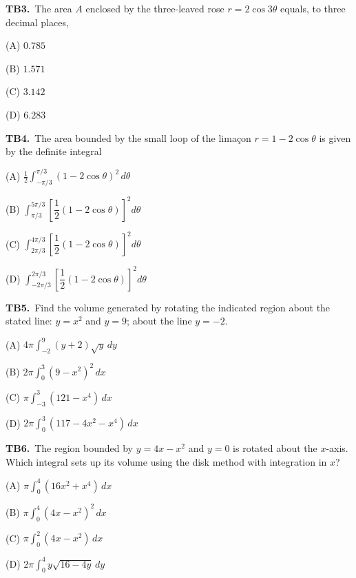 \documentclass[11pt]{article}
\begin{document}
\bigskip\noindent\textbf{TB3.}\ The area $A$ enclosed by the three-leaved rose $r=2\cos 3\theta$ equals, to three decimal places,
\begin{list}{}{\setlength{\leftmargin}{3em}\setlength{\labelwidth}{2.5em}\setlength{\itemsep}{0pt}\setlength{\topsep}{2pt}}
\item[(A)] $0.785$
\item[(B)] $1.571$
\item[(C)] $3.142$
\item[(D)] $6.283$
\end{list}

\bigskip\noindent\textbf{TB4.}\ The area bounded by the small loop of the limaçon $r=1-2\cos\theta$ is given by the definite integral
\begin{list}{}{\setlength{\leftmargin}{3em}\setlength{\labelwidth}{2.5em}\setlength{\itemsep}{0pt}\setlength{\topsep}{2pt}}
\item[(A)] $\displaystyle\frac12\int_{-\pi/3}^{\pi/3}(1-2\cos\theta)^2\,d\theta$
\item[(B)] $\displaystyle\int_{\pi/3}^{5\pi/3} \left[\dfrac{1}{2}(1-2\cos\theta)\right]^2 d\theta$
\item[(C)] $\displaystyle\int_{2\pi/3}^{4\pi/3} \left[\dfrac{1}{2}(1-2\cos\theta)\right]^2 d\theta$
\item[(D)] $\displaystyle\int_{-2\pi/3}^{2\pi/3} \left[\dfrac{1}{2}(1-2\cos\theta)\right]^2 d\theta$
\end{list}

\bigskip\noindent\textbf{TB5.}\ Find the volume generated by rotating the indicated region about the stated line: $y=x^2$ and $y=9$; about the line $y=-2$.
\begin{list}{}{\setlength{\leftmargin}{3em}\setlength{\labelwidth}{2.5em}\setlength{\itemsep}{0pt}\setlength{\topsep}{2pt}}
\item[(A)] $\displaystyle 4\pi\int_{-2}^{9} (y+2)\sqrt{y}\,dy$
\item[(B)] $\displaystyle 2\pi\int_0^3 (9-x^2)^2\,dx$
\item[(C)] $\displaystyle \pi\int_{-3}^{3} (121-x^4)\,dx$
\item[(D)] $\displaystyle 2\pi\int_0^3 (117-4x^2-x^4)\,dx$
\end{list}

\bigskip\noindent\textbf{TB6.}\ The region bounded by $y=4x-x^2$ and $y=0$ is rotated about the $x$-axis. Which integral sets up its volume using the disk method with integration in $x$?
\begin{list}{}{\setlength{\leftmargin}{3em}\setlength{\labelwidth}{2.5em}\setlength{\itemsep}{0pt}\setlength{\topsep}{2pt}}
\item[(A)] $\displaystyle \pi\int_0^4 (16x^2+x^4)\,dx$
\item[(B)] $\displaystyle \pi\int_0^4 (4x-x^2)^2\,dx$
\item[(C)] $\displaystyle \pi\int_0^2 (4x-x^2)\,dx$
\item[(D)] $\displaystyle 2\pi\int_0^4 y\sqrt{16-4y}\,dy$
\end{list}
\end{document}
